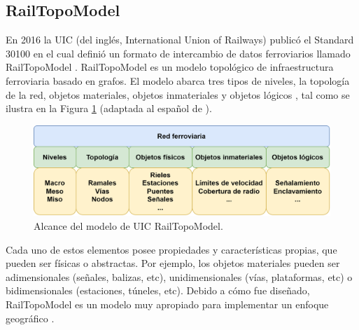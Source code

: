 \subsection{RailTopoModel}

    En 2016 la UIC (del inglés, International Union of Railways) publicó el Standard 30100 \cite{Paper_109} en el cual definió un formato de intercambio de datos ferroviarios llamado RailTopoModel \cite{Paper_146,Paper_149,Paper_150,Paper_200}. RailTopoModel es un modelo topológico de infraestructura ferroviaria basado en grafos. El modelo abarca tres tipos de niveles, la topología de la red, objetos materiales, objetos inmateriales y objetos lógicos \cite{Paper_109}, tal como se ilustra en la Figura \ref{fig:RTM_3} (adaptada al español de \cite{Paper_109}). 

    \begin{figure}[H]
        \centering
        \includegraphics[width=1\textwidth]{Figuras/objetos}
        \centering\caption{Alcance del modelo de UIC RailTopoModel.}
        \label{fig:RTM_3}
    \end{figure}

    Cada uno de estos elementos posee propiedades y características propias, que pueden ser físicas o abstractas. Por ejemplo, los objetos materiales pueden ser adimensionales (señales, balizas, etc), unidimensionales (vías, plataformas, etc) o bidimensionales (estaciones, túneles, etc). Debido a cómo fue diseñado, RailTopoModel es un modelo muy apropiado para implementar un enfoque geográfico \cite{Paper_146,Paper_149,Paper_180,Paper_182,Paper_99,Paper_107}.
    




